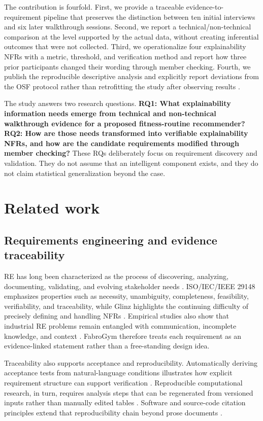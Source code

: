 \documentclass[pdflatex,sn-basic]{sn-jnl}
\begin{document}
The contribution is fourfold. First, we provide a traceable evidence-to-requirement pipeline that preserves the distinction between ten initial interviews and six later walkthrough sessions. Second, we report a technical/non-technical comparison at the level supported by the actual data, without creating inferential outcomes that were not collected. Third, we operationalize four explainability NFRs with a metric, threshold, and verification method and report how three prior participants changed their wording through member checking. Fourth, we publish the reproducible descriptive analysis and explicitly report deviations from the OSF protocol rather than retrofitting the study after observing results \cite{nosek2018,simmons2011,kerr1998}.

The study answers two research questions. \textbf{RQ1: What explainability information needs emerge from technical and non-technical walkthrough evidence for a proposed fitness-routine recommender?} \textbf{RQ2: How are those needs transformed into verifiable explainability NFRs, and how are the candidate requirements modified through member checking?} These RQs deliberately focus on requirement discovery and validation. They do not assume that an intelligent component exists, and they do not claim statistical generalization beyond the case.

\section{Related work}\label{sec:related}
\subsection{Requirements engineering and evidence traceability}
RE has long been characterized as the process of discovering, analyzing, documenting, validating, and evolving stakeholder needs \cite{nuseibeh2000,lamsweerde2001,pohl2010}. ISO/IEC/IEEE 29148 emphasizes properties such as necessity, unambiguity, completeness, feasibility, verifiability, and traceability, while Glinz highlights the continuing difficulty of precisely defining and handling NFRs \cite{iso29148,glinz2007}. Empirical studies also show that industrial RE problems remain entangled with communication, incomplete knowledge, and context \cite{mendez2017,ferrari2016}. FabroGym therefore treats each requirement as an evidence-linked statement rather than a free-standing design idea.

Traceability also supports acceptance and reproducibility. Automatically deriving acceptance tests from natural-language conditions illustrates how explicit requirement structure can support verification \cite{fischbach2023}. Reproducible computational research, in turn, requires analysis steps that can be regenerated from versioned inputs rather than manually edited tables \cite{sandve2013,peng2011}. Software and source-code citation principles extend that reproducibility chain beyond prose documents \cite{smith2016,dicosmo2020}.
\end{document}
